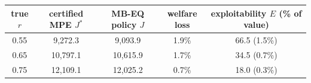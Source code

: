 \begin{tabular}{ccccc}
\toprule
true $r$ & certified MPE $J^*$ & MB-EQ policy $J$ & welfare loss & exploitability $E$ (\% of value) \\
\midrule
0.55 & 9{,}272.3 & 9{,}093.9 & 1.9\% & 66.5 (1.5\%) \\
0.65 & 10{,}797.1 & 10{,}615.9 & 1.7\% & 34.5 (0.7\%) \\
0.75 & 12{,}109.1 & 12{,}025.2 & 0.7\% & 18.0 (0.3\%) \\
\bottomrule
\end{tabular}
